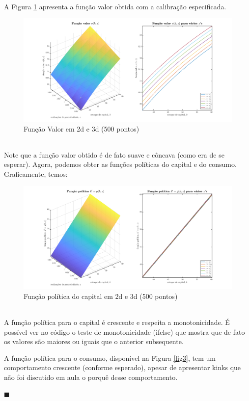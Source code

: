 \documentclass[10pt]{article}
\newcommand*{\QEDA}{\hfill\ensuremath{\blacksquare}}%
\newcommand\0{\mathbf{0}}
\newenvironment{sol}
    {\\[1em] {\color{magenta}\text{Resposta.}}
    }
    {{\color{blue!50!black}\QEDA}}
\begin{document}
\begin{enumerate}[wide]
\begin{sol}
A Figura \ref{fig1} apresenta a função valor obtida com a calibração especificada.
\begin{figure}[htp!]
\centering
\includegraphics[scale=0.3]{value_function_brute_force_500.png}
\caption{Função Valor em 2d e 3d (500 pontos)}
\label{fig1}
\end{figure}\\
Note que a função valor obtido é de fato suave e côncava (como era de se esperar). Agora, podemos obter as funções políticas do capital e do consumo. Graficamente, temos:
\begin{figure}[htp!]
\centering
\includegraphics[scale=0.3]{capital_policy_function_brute_force_500.png}
\caption{Função política do capital em 2d e 3d (500 pontos)}
\label{fig2}
\end{figure}\\
A função política para o capital é crescente e respeita a monotonicidade. É possível ver no código o teste de monotonicidade (ifelse) que mostra que de fato os valores são maiores ou iguais que o anterior subsequente. 

\newpage

A função política para o consumo, disponível na Figura \ref{fig3}, tem um comportamento crescente (conforme esperado), apesar de apresentar kinks que não foi discutido em aula o porquê desse comportamento.


\end{sol}
\end{enumerate}
\end{document}
